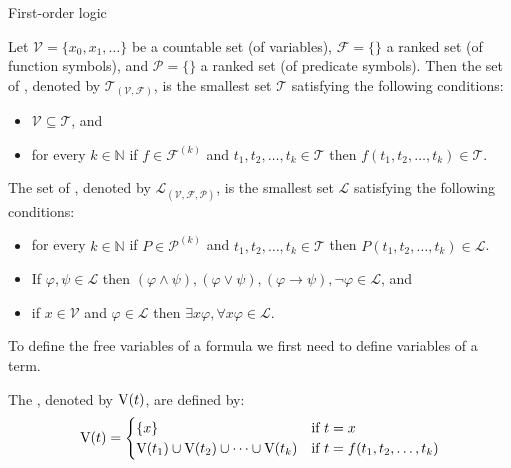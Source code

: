 First-order logic
\begin{definition}
Let $\mathcal{V}=\{x_0,x_1,\dots\}$ be a countable set (of variables), $\mathcal{F}=\{\}$ a ranked set (of function symbols), and $\mathcal{P}=\{\}$ a ranked set (of predicate symbols). Then the set of , denoted by $\mathcal{T}_{(\mathcal{V},\mathcal{F})}$, is the smallest set $\mathcal{T}$ satisfying the following conditions:
\begin{itemize}
\item $\mathcal{V} \subseteq \mathcal{T}$, and
\item for every $k\in\mathbb{N}$ if $f\in\mathcal{F}^{(k)}$ and $t_1,t_2,\dots,t_k\in\mathcal{T}$ then $f(t_1,t_2,\dots,t_k)\in\mathcal{T}$.
\end{itemize}
The set of , denoted by $\mathcal{L}_{(\mathcal{V},\mathcal{F},\mathcal{P})}$, is the smallest set $\mathcal{L}$ satisfying the following conditions:
\begin{itemize}
\item for every $k\in\mathbb{N}$ if $P\in\mathcal{P}^{(k)}$ and $t_1,t_2,\dots,t_k\in\mathcal{T}$ then $P(t_1,t_2,\dots,t_k)\in\mathcal{L}$.
\item If $\varphi,\psi\in\mathcal{L}$ then $(\varphi\wedge\psi), (\varphi\vee\psi), (\varphi\to\psi), \neg \varphi\in\mathcal{L}$, and %
\item if $x\in\mathcal{V}$ and $\varphi\in\mathcal{L}$ then $\exists x\varphi,\forall x\varphi\in\mathcal{L}$. %
\end{itemize}
\end{definition}
To define the free variables of a formula we first need to define variables of a term.
\begin{definition}
The , denoted by $\text{V}(t)$, are defined by:
\[\text{V}(t)=
\begin{cases}
\{x\} & \text{if $t=x$}\\
\text{V}(t_1)\cup \text{V}(t_2)\cup\dots\cup \text{V}(t_k) & \text{if $t=f(t_1,t_2,\dots,t_k)$}
\end{cases}\]
\end{definition}

